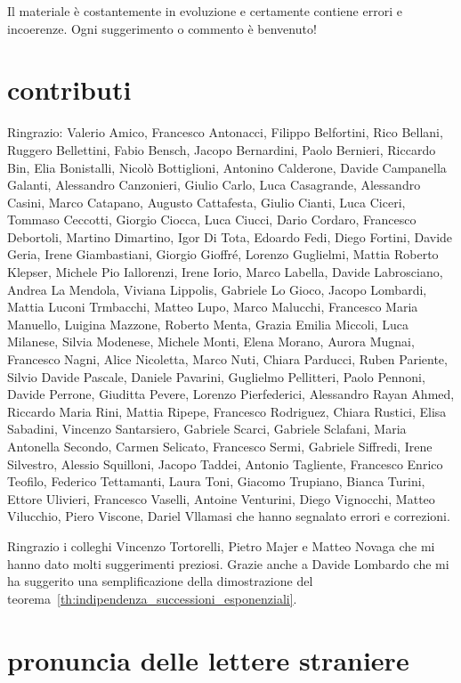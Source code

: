 Il materiale è costantemente in evoluzione %
e certamente contiene errori e incoerenze. Ogni suggerimento o commento è %
benvenuto! %


\section*{contributi}

Ringrazio:
%
Valerio Amico,
Francesco Antonacci,
Filippo Belfortini,
Rico Bellani,
Ruggero Bellettini,
Fabio Bensch,
Jacopo Bernardini,
Paolo Bernieri,
Riccardo Bin,
Elia Bonistalli,
Nicolò Bottiglioni,
Antonino Calderone,
Davide Campanella Galanti,
Alessandro Canzonieri,
Giulio Carlo,
Luca Casagrande,
Alessandro Casini,
Marco Catapano,
Augusto Cattafesta,
Giulio Cianti,
Luca Ciceri,
Tommaso Ceccotti,
Giorgio Ciocca,
Luca Ciucci,
Dario Cordaro,
Francesco Debortoli,
Martino Dimartino,
Igor Di Tota,
Edoardo Fedi,
Diego Fortini,
Davide Geria,
Irene Giambastiani,
Giorgio Gioffré,
Lorenzo Guglielmi,
Mattia Roberto Klepser,
Michele Pio Iallorenzi,
Irene Iorio,
Marco Labella,
Davide Labrosciano,
Andrea La Mendola,
Viviana Lippolis,
Gabriele Lo Gioco,
Jacopo Lombardi,
Mattia Luconi Trmbacchi,
Matteo Lupo,
Marco Malucchi,
Francesco Maria Manuello,
Luigina Mazzone,
Roberto Menta,
Grazia Emilia Miccoli,
Luca Milanese,
Silvia Modenese,
Michele Monti,
Elena Morano,
Aurora Mugnai,
Francesco Nagni,
Alice Nicoletta,
Marco Nuti,
Chiara Parducci,
Ruben Pariente,
Silvio Davide Pascale,
Daniele Pavarini,
Guglielmo Pellitteri,
Paolo Pennoni,
Davide Perrone,
Giuditta Pevere,
Lorenzo Pierfederici,
Alessandro Rayan Ahmed,
Riccardo Maria Rini,
Mattia Ripepe,
Francesco Rodriguez,
Chiara Rustici,
Elisa Sabadini,
Vincenzo Santarsiero,
Gabriele Scarci,
Gabriele Sclafani,
Maria Antonella Secondo,
Carmen Selicato,
Francesco Sermi,
Gabriele Siffredi,
Irene Silvestro,
Alessio Squilloni,
Jacopo Taddei,
Antonio Tagliente,
Francesco Enrico Teofilo,
Federico Tettamanti,
Laura Toni,
Giacomo Trupiano,
Bianca Turini,
Ettore Ulivieri,
Francesco Vaselli,
Antoine Venturini,
Diego Vignocchi,
Matteo Vilucchio,
Piero Viscone,
Dariel Vllamasi
%
che hanno segnalato errori e correzioni.

Ringrazio i colleghi Vincenzo Tortorelli, Pietro Majer
e Matteo Novaga
che mi hanno dato molti suggerimenti preziosi.
Grazie anche a Davide Lombardo che mi ha suggerito una semplificazione 
della dimostrazione del teorema~\ref{th:indipendenza_successioni_esponenziali}.

\newpage

\section*{pronuncia delle lettere straniere}

